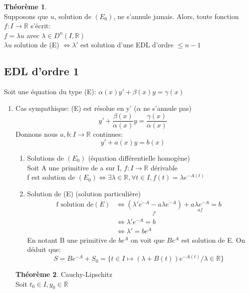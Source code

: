 \documentclass[fleqn]{article}
\theoremstyle{definition} \newtheorem*{defi}{D\'efinition}
\theoremstyle{definition} \newtheorem*{theo}{Th\'eor\`eme}
\theoremstyle{remark} \newtheorem*{rqs}{Remarques}
\begin{document}
\begin{theo} $ $\\
	Supposons que $u$, solution de $(E_0)$, ne s'annule jamais. Alors, toute fonction $f: I \rightarrow \mathbb{R}$ s'\'ecrit:\\
	$f = \lambda u$ avec $\lambda \in D^n(I, \mathbb{R})$ \\
	$\lambda u$ solution de (E) $\Leftrightarrow \lambda '$ est solution d'une EDL d'ordre $\leq n-1$
\end{theo}

\subsection{EDL d'ordre 1}
Soit une \'equation du type (E): $\alpha(x)y' + \beta(x)y = \gamma(x)$

\begin{enumerate}
	\item Cas sympathique: (E) est r\'esolue en y' ($\alpha$ ne s'annule pas)
		\[y' + \frac{\beta(x)}{\alpha(x)}y = \frac{\gamma(x)}{\alpha(x)}\]
		Donnons nous $a, b : I \rightarrow \mathbb{R}$ continues:
		\[y' + a(x)y = b(x)\]
		\begin{enumerate}
			\item Solutions de $(E_0)$ (\'equation diff\'erentielle homog\`ene)\\
				Soit A une primitive de a sur I, $f: I \rightarrow \mathbb{R}$ d\'erivable\\
				f est solution de $(E_0) \Leftrightarrow \exists \lambda \in \mathbb{R}, \forall t \in I, f(t) = \lambda e^{-A(t)}$
			\item Solution de (E) (solution particuli\`ere)
				\begin{align*}
					\text{f solution de} (E) &\Leftrightarrow \underset{f'}{(\lambda ' e^{-A} - a \lambda e^{-A})} +
					\underset{af}{a \lambda e^{-A}} = b\\
					&\Leftrightarrow \lambda ' e^{-A} = b \\
					&\Leftrightarrow \lambda ' = be^A
				\end{align*}
				En notant B une primitive de $be^A$ on voit que $Be^A$ est solution de E. On d\'eduit que:\\
				\[S = Be^{-A} + S_0 = \{t\in I \mapsto (\lambda + B(t))e^{-A(t)}/ \lambda \in \mathbb{R}\}\]
		\end{enumerate}
		\begin{theo} Cauchy-Lipschitz\\
			Soit $t_0 \in I, y_0 \in \mathbb{R}$ \\

\end{theo}
\end{enumerate}
\end{document}
